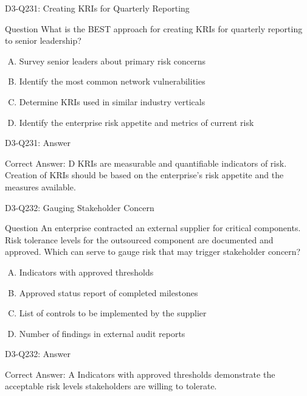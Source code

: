 \documentclass{beamer}
\begin{document}
	\begin{frame}{D3-Q231: Creating KRIs for Quarterly Reporting}
		\begin{block}{Question}
			What is the BEST approach for creating KRIs for quarterly reporting to senior leadership?
		\end{block}
		\begin{enumerate}[(A)]
			\item Survey senior leaders about primary risk concerns
			\item Identify the most common network vulnerabilities
			\item Determine KRIs used in similar industry verticals
			\item Identify the enterprise risk appetite and metrics of current risk
		\end{enumerate}
	\end{frame}
	\begin{frame}{D3-Q231: Answer}
		\begin{block}{Correct Answer: D}
			KRIs are measurable and quantifiable indicators of risk. Creation of KRIs should be based on the enterprise's risk appetite and the measures available.
		\end{block}
	\end{frame}
	
	\begin{frame}{D3-Q232: Gauging Stakeholder Concern}
		\begin{block}{Question}
			An enterprise contracted an external supplier for critical components. Risk tolerance levels for the outsourced component are documented and approved. Which can serve to gauge risk that may trigger stakeholder concern?
		\end{block}
		\begin{enumerate}[(A)]
			\item Indicators with approved thresholds
			\item Approved status report of completed milestones
			\item List of controls to be implemented by the supplier
			\item Number of findings in external audit reports
		\end{enumerate}
	\end{frame}
	\begin{frame}{D3-Q232: Answer}
		\begin{block}{Correct Answer: A}
			Indicators with approved thresholds demonstrate the acceptable risk levels stakeholders are willing to tolerate.
		\end{block}
	\end{frame}
	
\end{document}
